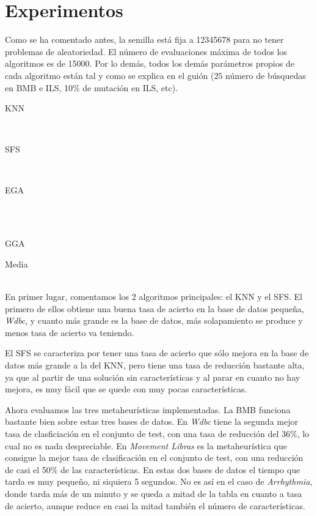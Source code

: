 \documentclass[a4paper, 11pt]{article}
\begin{document}
  \section{Experimentos}
    Como se ha comentado antes, la semilla está fija a 12345678 para no tener problemas de aleatoriedad. El número de evaluaciones máxima de todos los algoritmos es de 15000. Por lo demás, todos los demás parámetros propios de cada algoritmo están tal y como se explica en el guión ($25$ número de búsquedas en BMB e ILS, 10\% de mutación en ILS, etc). \\

    \newpage

    \centerline{KNN}
    \\
    \centerline{SFS}
    
    \\ \centerline{EGA}
    \\
    \\ \centerline{GGA}
    
    \newpage
    \centerline{Media}
    \\

    En primer lugar, comentamos los 2 algoritmos principales: el KNN y el SFS. El primero de ellos obtiene una buena tasa de acierto en la base de datos pequeña, \emph{Wdbc}, y cuanto más grande es la base de datos, más solapamiento se produce y menos tasa de acierto va teniendo.

    El SFS se caracteriza por tener una tasa de acierto que sólo mejora en la base de datos más grande a la del KNN, pero tiene una tasa de reducción bastante alta, ya que al partir de una solución sin características y al parar en cuanto no hay mejora, es muy fácil que se quede con muy pocas características.

    Ahora evaluamos las tres metaheurísticas implementadas. La BMB funciona bastante bien sobre estas tres bases de datos. En \emph{Wdbc} tiene la segunda mejor tasa de clasficiación en el conjunto de test, con una tasa de reducción del 36\%, lo cual no es nada despreciable. En \emph{Movement Libras} es la metaheurística que consigue la mejor tasa de clasificación en el conjunto de test, con una reducción de casi el 50\% de las características. En estas dos bases de datos el tiempo que tarda es muy pequeño, ni siquiera 5 segundos. No es así en el caso de \emph{Arrhythmia}, donde tarda más de un minuto y se queda a mitad de la tabla en cuanto a tasa de acierto, aunque reduce en casi la mitad también el número de características.
\end{document}
